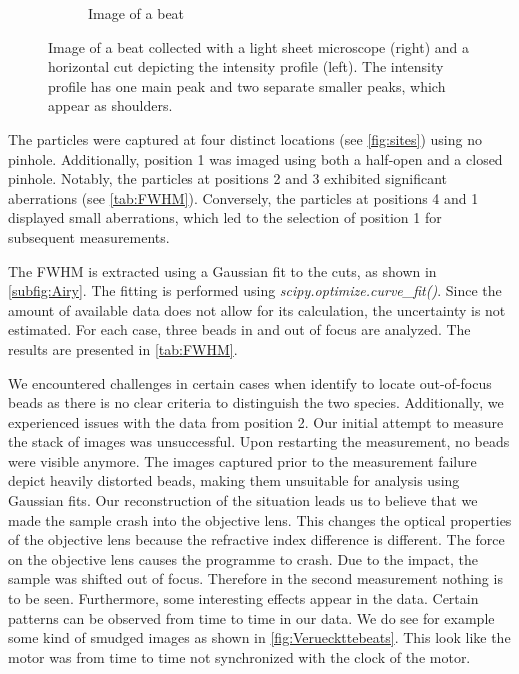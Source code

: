 \begin{figure}[h]
\begin{subfigure}{0.43\linewidth}
        \caption{Image of a beat}
        \label{subfig:AiryBild}
    \end{subfigure}
    \caption{Image of a beat collected with a light sheet microscope (right) and a horizontal cut depicting the intensity profile (left). The intensity profile has one main peak and two separate smaller peaks, which appear as shoulders.}
    \label{fig:Airy}
\end{figure}


The particles were captured at four distinct locations (see \cref{fig:sites}) using no pinhole. Additionally, position 1 was imaged using both a half-open and a closed pinhole. Notably, the particles at positions 2 and 3 exhibited significant aberrations (see \cref{tab:FWHM}).
Conversely, the particles at positions 4 and 1 displayed small aberrations, which led to the selection of position 1 for subsequent measurements.


The FWHM is extracted using a Gaussian fit to the cuts, as shown in \cref{subfig:Airy}. The fitting is
performed using \textit{scipy.optimize.curve\_fit()}. Since the amount of available data does not allow
for its calculation, the uncertainty is not estimated. For each case, three beads in and out of
focus are analyzed. The results are presented in \cref{tab:FWHM}.

We encountered challenges in certain cases when identify to locate out-of-focus beads as there is no clear criteria to distinguish the two species.
Additionally, we experienced issues with the data from position 2. Our initial attempt to measure the stack of images was unsuccessful. 
Upon restarting the measurement, no beads were visible anymore. The images captured prior to the measurement failure depict heavily distorted beads, making them unsuitable for analysis using Gaussian fits.
Our reconstruction of the situation leads us to believe that we made the sample crash into the objective lens. This changes the optical properties of the objective lens because 
the refractive index difference is different. The force on the objective lens causes the programme to crash. Due to the impact, the sample was shifted out of focus. Therefore in the second measurement nothing is to be seen.
Furthermore, some interesting effects appear in the data. Certain patterns can be observed from time to time in our data. We do see for example 
some kind of smudged images as shown in \cref{fig:Verueckttebeats}. This look like the motor was from time to time not synchronized with the clock of the motor. 

